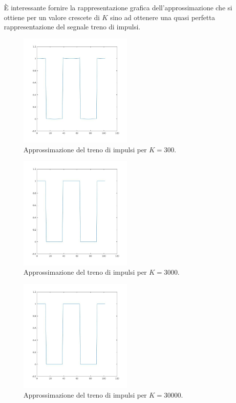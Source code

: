 \documentclass[12pt,oneside,openany]{memoir}
\numberwithin{equation}{subsection}
\begin{document}
\`E interessante fornire la rappresentazione grafica dell'approssimazione che si
ottiene per un valore crescete di $K$ sino ad ottenere una quasi perfetta
rappresentazione del segnale treno di impulsi.
\begin{figure}[H]
	\centering
	\captionsetup{justification=centering}
	\includegraphics[width=0.5\textwidth]{images/matlab_approssimazione_5.jpg}
	\caption{Approssimazione del treno di impulsi per $K = 300$.}
\end{figure}
\begin{figure}[H]
	\centering
	\captionsetup{justification=centering}
	\includegraphics[width=0.5\textwidth]{images/matlab_approssimazione_6.jpg}
	\caption{Approssimazione del treno di impulsi per $K = 3000$.}
\end{figure}
\begin{figure}[H]
	\centering
	\captionsetup{justification=centering}
	\includegraphics[width=0.5\textwidth]{images/matlab_approssimazione_7.jpg}
	\caption{Approssimazione del treno di impulsi per $K = 30000$.}
\end{figure}
\end{document}
